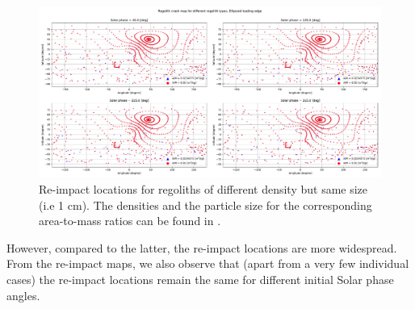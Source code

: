 \FloatBarrier
\begin{figure}[htb]
\centering
\captionsetup{justification=centering}
\includegraphics[angle=90, width=\textwidth, height=\textheight, keepaspectratio=true]{leading_edge_perturbations/crashMap_3P2_7P5_density_1cm_radius.pdf}
\caption{Re-impact locations for regoliths of different density but same size (i.e 1 cm). The densities and the particle size for the corresponding area-to-mass ratios can be found in .}
\label{fig:crashmap_3.2_7.5_density_1cmRadius_leadingEdge}
\end{figure}
\FloatBarrier
However, compared to the latter, the re-impact locations are more widespread. From the re-impact maps, we also observe that (apart from a very few individual cases) the re-impact locations remain the same for different initial Solar phase angles.
%
\newline\newline
%
